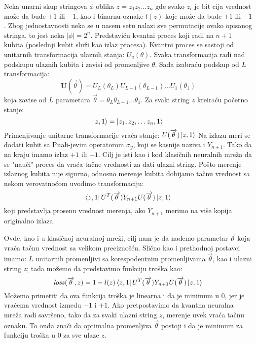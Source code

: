 \documentclass[12pt, letterpaper, oneside]{article}
\begin{document}
Neka unarni skup stringova $\phi$ oblika $z=z_1 z_2 \dots z_n$ gde svako $z_i$ je bit cija vrednost može da bude $+1$ ili $-1$,
kao i binarnu oznake $l(z)$ koje može da bude $+1$ ili $-1$. Zbog jednostavnosti neka se u nasem setu nalazi sve permutacije ovako opisanog stringa, to jest neka $|\phi|=2^n$.
Predstaviću kvantni proces koji radi na $n+1$ kubita (poslednji kubit služi kao izlaz procesa). Kvantni proces se sastoji od unitarnih transformacija ulaznih stanja: ${U_a(\theta)}$.
Svaka transformacija radi nad podskupu ulaznih kubita i zavisi od promenljive $\theta$. Sada izabraću podskup od $L$ transformacija:
\[
  \mathbf{U}(\overrightarrow{\theta}) = U_{L}(\theta_{L}) U_{L-1}(\theta_{L-1}) \dots U_{1}(\theta_{1}) 
\]
koja zavise od $L$ parametara $\overrightarrow{\theta}=\theta_{L} \theta_{L-1} \dots \theta_{1}$. Za svaki string $z$ kreiraću početno stanje:
\[
    \Ket{z,1} = \Ket{z_1, z_2, \dots z_n, 1}
\]
Primenjivanje unitarne transformacije vraća stanje: $U(\overrightarrow{\theta})\Ket{z,1}$
Na izlazu meri se dodati kubit sa Puali-jevim operatorom $\sigma_y$, koji se kasnije naziva i $Y_{n+1}$.
Tako da na kraju imamo izlaz $+1$ ili $-1$. Cilj je isti kao i kod klasičnih neuralnih mreža da se "nauči" proces da vraća tačne vrednosti za dati ulazni string.
Pošto merenje izlaznog kubita nije sigurno, odnosno merenje kubita dobijamo tačnu vrednost sa nekom verovatnoćom uvodimo transformaciju:
\[
    \bra{z,1}U^T(\overrightarrow{\theta})Y_{n+1}U(\overrightarrow{\theta})\Ket{z,1}
\]
koji predstavlja prosenu vrednost merenja, ako $Y_{n+1}$ merimo na više kopija originalno izlaza.

Ovde, kao i u klasičnoj neuralnoj mreži, cilj nam je da nađemo parametar $\overrightarrow{\theta}$ koja vraća tačnu vrednost sa velikom preciznošću.
Slično kao i prethodnoj postavci imamo: $L$ unitarnih promenljivi sa korespodentnim promenljivama $\overrightarrow{\theta}$, kao i ulazni string $z$; 
tada možemo da predstavimo funkciju troška kao:
\[
    \mathit{loss}(\overrightarrow{\theta},z) = 1 - l(z)\bra{z,1}U^T(\overrightarrow{\theta})Y_{n+1}U(\overrightarrow{\theta})\Ket{z,1}
\]
Možemo primetiti da ova funkcija troška je linearna i da je minimum u $0$, jer je vraćema vrednost između $-1$ i $+1$.
Ako pretpostavimo da kvantna neuralna mreža radi savršeno, tako da za svaki ulazni string $z$, merenje uvek vraća tačnu oznaku.
To onda znači da optimalna promenljiva $\overrightarrow{\theta}$ postoji i da je minimum za funkciju troška u $0$ za sve ulaze $z$.
\end{document}
